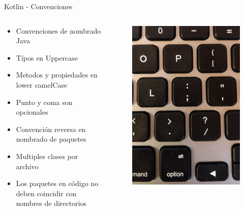 \documentclass[aspectratio=169]{beamer}
\begin{document}
\begin{frame}{Kotlin - Convenciones}
    \begin{columns}
        \begin{column}{0.5\textwidth}
            \begin{itemize}
                \item Convenciones de nombrado Java
                \item Típos en Uppercase
                \item Metodos y propiedades en lower camelCase
                \item Punto y coma son opcionales
                \item Convención reversa en nombrado de paquetes
                \item Multiples clases por archivo
                \item Los paquetes en código no deben coincidir con nombres de directorios
            \end{itemize}
        \end{column}
        \begin{column}{0.5\textwidth}  %
            \begin{figure}
                \centering
                \includegraphics[width=0.7\linewidth]{Images/semicolon}
            \end{figure}
        \end{column}
    \end{columns}
\end{frame}
\end{document}
